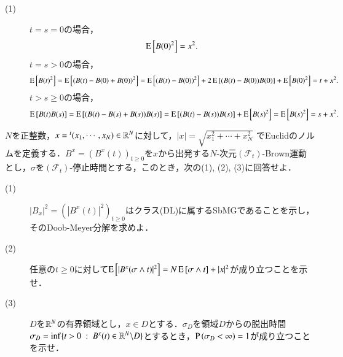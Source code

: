 \begin{prf}
\begin{description}\mbox{}
	\item[(1)] 
		$t = s = 0$の場合，
		\begin{align}
			\operatorname{E} \left[ B(0)^2 \right] = x^2.
		\end{align}
		$t = s > 0$の場合，
		\begin{align}
			\operatorname{E} \left[ B(t)^2 \right] = \operatorname{E} \left[ (B(t) - B(0) + B(0))^2 \right] = \operatorname{E} \left[ (B(t) - B(0))^2 \right] + 2\operatorname{E} \left[ (B(t) - B(0))B(0) \right] + \operatorname{E} \left[ B(0)^2 \right] = t + x^2.
		\end{align}
		$t > s \geq 0$の場合，
		\begin{align}
			\operatorname{E} \left[ B(t)B(s) \right] = \operatorname{E} \left[ (B(t) - B(s) + B(s))B(s) \right] = \operatorname{E} \left[ (B(t) - B(s))B(s) \right] + \operatorname{E} \left[ B(s)^2 \right] = \operatorname{E} \left[ B(s)^2 \right] =  s + x^2.
		\end{align}
\end{description}
\end{prf}

$N$を正整数，$x = {}^t(x_1,\cdots,x_N) \in \mathbb{R}^N$に対して，$|x| = \sqrt{x_1^2 + \cdots + x_N^2}$
でEuclidのノルムを定義する．$B^x = \left(B^x(t)\right)_{t \geq 0}$を$x$から出発する$N$-次元$(\mathcal{F}_t)$-Brown運動
とし，$\sigma$を$(\mathcal{F}_t)$-停止時間とする，このとき，次の(1), (2), (3)に回答せよ．
\begin{description}
	\item[(1)] $|B_x|^2 = \left(\left|B^x(t)\right|^2\right)_{t \geq 0}$はクラス(DL)に属するSbMGであることを示し，
		そのDoob-Meyer分解を求めよ．
	\item[(2)] 任意の$t \geq 0$に対して$\operatorname{E} \left[ |B^x(\sigma \wedge t)|^2 \right] = N\operatorname{E} \left[ \sigma \wedge t \right] + |x|^2$が成り立つことを示せ．
	\item[(3)] $D$を$\mathbb{R}^N$の有界領域とし，$x \in D$とする．$\sigma_D$を領域$D$からの脱出時間
		$\sigma_D = \operatorname*{inf}_{} \{ t > 0\ :\ B^x(t) \in \mathbb{R}^N \backslash D \}$とするとき，$\operatorname{P} \left(\sigma_D < \infty\right) = 1$が成り立つことを示せ．
\end{description}

